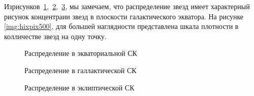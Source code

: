 \documentclass[14pt]{article} %
\begin{document}
Изрисунков~\ref{img:all_ra},~\ref{img:alllv},~\ref{img:alllon}, мы замечаем, что распределение звезд имеет характерный рисунок концентраии звезд в плоскости галактического экватора. На рисунке \ref{img:hixpix500}, для большей наглядности представлена шкала плотности в колличестве звезд на одну точку.

\begin{figure}[h!]
\caption{Распределение в экваториальной СК}
\label{img:all_ra}
\end{figure}
\begin{figure}[h!]
\caption{Распределение в галлактической СК}
\label{img:alllv}
\end{figure}
\begin{figure}[h!]
\caption{Распределение в эклиптической СК}
\label{img:alllon}
\end{figure}
\end{document}
